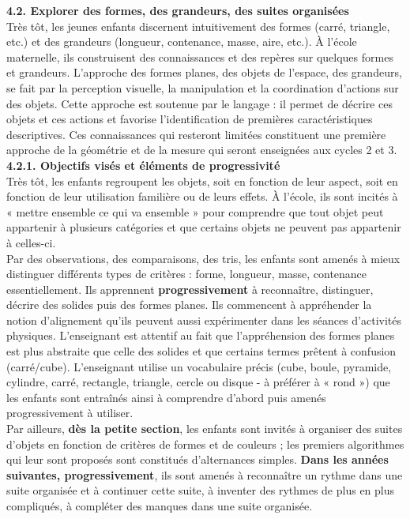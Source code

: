 \begin{center}
   \begin{minipage}{16cm}
      \textsf{{\bf 4.2. Explorer des formes, des grandeurs, des suites organisées} \\ [1mm]
      Très tôt, les jeunes enfants discernent intuitivement des formes (carré, triangle, etc.) et des grandeurs (longueur, contenance, masse, aire, etc.). À l’école maternelle, ils construisent des connaissances et des repères sur quelques formes et grandeurs. L’approche des formes planes, des objets de l’espace, des grandeurs, se fait par la perception visuelle, la manipulation et la coordination d’actions sur des objets. Cette approche est soutenue par le langage : il permet de décrire ces objets et ces actions et favorise l’identification de premières caractéristiques descriptives. Ces connaissances qui resteront limitées constituent une première approche de la géométrie et de la mesure qui seront enseignées aux cycles 2 et 3. \\ [2mm]
      {\bf 4.2.1. Objectifs visés et éléments de progressivité} \\ [1mm]
      Très tôt, les enfants regroupent les objets, soit en fonction de leur aspect, soit en fonction de leur utilisation familière ou de leurs effets. À l’école, ils sont incités à « mettre ensemble ce qui va ensemble » pour comprendre que tout objet peut appartenir à plusieurs catégories et que certains objets ne peuvent pas appartenir à celles-ci. \\
      Par des observations, des comparaisons, des tris, les enfants sont amenés à mieux distinguer différents types de critères : forme, longueur, masse, contenance essentiellement. Ils apprennent {\bf progressivement} à reconnaître, distinguer, décrire des solides puis des formes planes. Ils commencent à appréhender la notion d’alignement qu’ils peuvent aussi expérimenter dans les séances d’activités physiques. L’enseignant est attentif au fait que l’appréhension des formes planes est plus abstraite que celle des solides et que certains termes prêtent à confusion (carré/cube). L’enseignant utilise un vocabulaire précis (cube, boule, pyramide, cylindre, carré, rectangle, triangle, cercle ou disque - à préférer à « rond ») que les enfants sont entraînés ainsi à comprendre d’abord puis amenés progressivement à utiliser. \\
      Par ailleurs, {\bf dès la petite section}, les enfants sont invités à organiser des suites d’objets en fonction de critères de formes et de couleurs ; les premiers algorithmes qui leur sont proposés sont constitués d’alternances simples. {\bf Dans les années suivantes, progressivement}, ils sont amenés à reconnaître un rythme dans une suite organisée et à continuer cette suite, à inventer des \og rythmes \fg{} de plus en plus compliqués, à compléter des manques dans une suite organisée.}
   \end{minipage}
\end{center}

